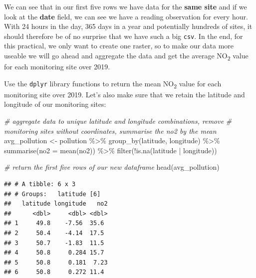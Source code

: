 \documentclass[
]{book}
\newenvironment{Shaded}{\begin{snugshade}}{\end{snugshade}}
\newcommand{\AttributeTok}[1]{\textcolor[rgb]{0.77,0.63,0.00}{#1}}
\newcommand{\CommentTok}[1]{\textcolor[rgb]{0.56,0.35,0.01}{\textit{#1}}}
\newcommand{\FunctionTok}[1]{\textcolor[rgb]{0.00,0.00,0.00}{#1}}
\newcommand{\NormalTok}[1]{#1}
\newcommand{\OtherTok}[1]{\textcolor[rgb]{0.56,0.35,0.01}{#1}}
\newcommand{\SpecialCharTok}[1]{\textcolor[rgb]{0.00,0.00,0.00}{#1}}
\begin{document}
We can see that in our first five rows we have data for the \textbf{same site} and if we look at the \textbf{date} field, we can see we have a reading observation for every hour. With 24 hours in the day, 365 days in a year and potentially hundreds of sites, it should therefore be of no surprise that we have such a big \texttt{csv}. In the end, for this practical, we only want to create one raster, so to make our data more useable we will go ahead and aggregate the data and get the average NO\textsubscript{2} value for each monitoring site over 2019.

Use the \texttt{dplyr} library functions to return the mean NO\textsubscript{2} value for each monitoring site over 2019. Let's also make sure that we retain the latitude and longitude of our monitoring sites:

\begin{Shaded}
\begin{Highlighting}[]
\CommentTok{\# aggregate data to unique latitude and longitude combinations, remove}
\CommentTok{\# monitoring sites without coordinates, summarise the no2 by the mean}
\NormalTok{avg\_pollution }\OtherTok{\textless{}{-}}\NormalTok{ pollution }\SpecialCharTok{\%\textgreater{}\%}
    \FunctionTok{group\_by}\NormalTok{(latitude, longitude) }\SpecialCharTok{\%\textgreater{}\%}
    \FunctionTok{summarise}\NormalTok{(}\AttributeTok{no2 =} \FunctionTok{mean}\NormalTok{(no2)) }\SpecialCharTok{\%\textgreater{}\%}
    \FunctionTok{filter}\NormalTok{(}\SpecialCharTok{!}\FunctionTok{is.na}\NormalTok{(latitude }\SpecialCharTok{|}\NormalTok{ longitude))}

\CommentTok{\# return the first five rows of our new dataframe}
\FunctionTok{head}\NormalTok{(avg\_pollution)}
\end{Highlighting}
\end{Shaded}

\begin{verbatim}
## # A tibble: 6 x 3
## # Groups:   latitude [6]
##   latitude longitude   no2
##      <dbl>     <dbl> <dbl>
## 1     49.8    -7.56  35.6 
## 2     50.4    -4.14  17.5 
## 3     50.7    -1.83  11.5 
## 4     50.8     0.284 15.7 
## 5     50.8     0.181  7.23
## 6     50.8     0.272 11.4
\end{verbatim}

\begin{Shaded}
\end{Shaded}
\end{document}
